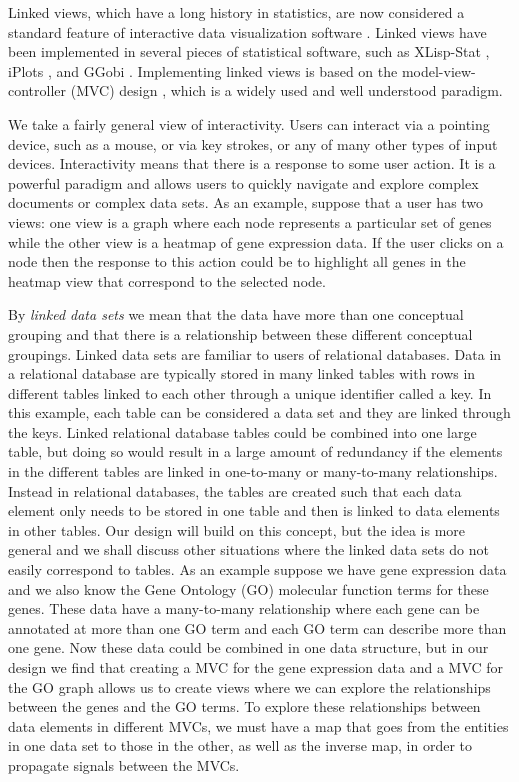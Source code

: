 \documentclass[11pt]{article}
\begin{document}
Linked views, which have a long history in statistics, are now
considered a standard feature of interactive data visualization
software \cite{GGobi}.  Linked views have been implemented in several
pieces of statistical software, such as XLisp-Stat \cite{Lisp}, iPlots
\cite{iPlots}, and
GGobi \cite{GGobiMan}.  Implementing linked views is based on the
model-view-controller (MVC) design \cite{DesignPatterns}, which is a
widely used and well understood paradigm. 

We take a fairly general view of interactivity. Users can interact via
a pointing device, such as a mouse, or via key strokes, or any of many
other types of input devices.  Interactivity means that there is a
response to some user action.  It is a powerful paradigm and allows
users to quickly navigate and explore complex documents or complex
data sets.  As an example, suppose that a user has two views: one view
is a graph where each node represents a particular set of genes while
the other view is a heatmap of gene expression data.  If the user
clicks on a node then the response to this action could be to
highlight all genes in the heatmap view that correspond to the
selected node.

By \textit{linked data sets} we mean that the data have more than one
conceptual grouping and that there is a relationship between these
different conceptual groupings.  Linked data sets are 
familiar to users of relational databases.  Data in a relational
database are typically stored in many linked tables with rows in
different tables linked to each other through a unique identifier
called a key.  In this example, each table can be considered a data set
and they are linked through the keys. 
Linked relational database tables could be combined into one
large table, but doing so would result in a large amount of redundancy if
the elements in the different tables are linked in one-to-many or many-to-many
relationships.  Instead in relational databases, the tables are created such
that each data element only needs to be stored in one table and then is linked
to data elements in other tables.  Our design will build on this
concept, but the idea is more general and we shall discuss other situations
where the linked data sets do not easily correspond to tables.  As an example
suppose we have gene expression data and we
also know the Gene Ontology (GO) molecular function terms for these genes. 
These data have a many-to-many relationship where each gene can be
annotated at more than one GO term and each GO term can describe more than one
gene.  Now these data could be combined in one data structure, but in
our design we find that creating a MVC for the gene expression data and a MVC
for the GO graph allows us to create views where we can explore the
relationships between the genes and the GO terms.  To explore these
relationships between data elements in different MVCs, we
must have a map that goes from the entities in one data set to those in the
other, as well as the inverse map, in order to propagate signals between the
MVCs.  
\end{document}
